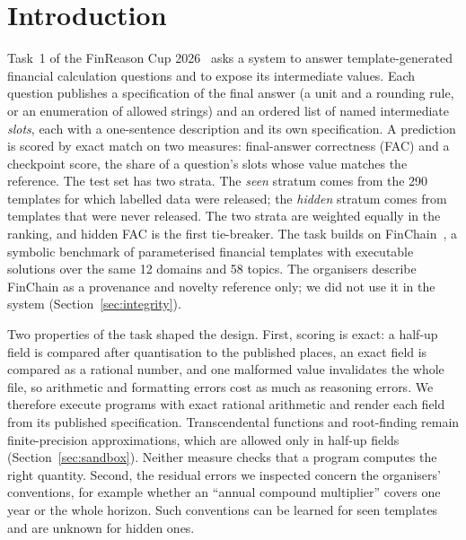 \documentclass[conference]{IEEEtran}
\begin{document}
\section{Introduction}
Task~1 of the FinReason Cup 2026~\cite{finreason2026overview,finreason2026task1overview} asks a system to answer template-generated financial calculation questions and to expose its intermediate values. Each question publishes a specification of the final answer (a unit and a rounding rule, or an enumeration of allowed strings) and an ordered list of named intermediate \emph{slots}, each with a one-sentence description and its own specification. A prediction is scored by exact match on two measures: final-answer correctness (FAC) and a checkpoint score, the share of a question's slots whose value matches the reference. The test set has two strata. The \emph{seen} stratum comes from the 290 templates for which labelled data were released; the \emph{hidden} stratum comes from templates that were never released. The two strata are weighted equally in the ranking, and hidden FAC is the first tie-breaker. The task builds on FinChain~\cite{xie-etal-2026-finchain}, a symbolic benchmark of parameterised financial templates with executable solutions over the same 12 domains and 58 topics. The organisers describe FinChain as a provenance and novelty reference only; we did not use it in the system (Section~\ref{sec:integrity}).

Two properties of the task shaped the design. First, scoring is exact: a half-up field is compared after quantisation to the published places, an exact field is compared as a rational number, and one malformed value invalidates the whole file, so arithmetic and formatting errors cost as much as reasoning errors. We therefore execute programs with exact rational arithmetic and render each field from its published specification. Transcendental functions and root-finding remain finite-precision approximations, which are allowed only in half-up fields (Section~\ref{sec:sandbox}). Neither measure checks that a program computes the right quantity. Second, the residual errors we inspected concern the organisers' conventions, for example whether an ``annual compound multiplier'' covers one year or the whole horizon. Such conventions can be learned for seen templates and are unknown for hidden ones.
\end{document}
